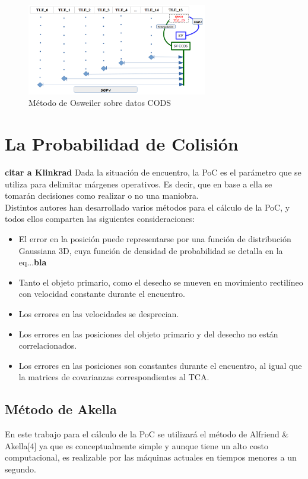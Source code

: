 \begin{figure}[!h]
 \centering
 \includegraphics[width=0.7\textwidth]{imagenes/Osweiler_sobre_Cods.png}
 \caption{M\'etodo de Osweiler sobre datos CODS}
\end{figure}

\section{La Probabilidad de Colisi\'on}
{\bf{citar a Klinkrad}}
Dada la situaci\'on de encuentro, la PoC es el par\'ametro que se utiliza para delimitar m\'argenes operativos.
Es decir, que en base a ella se tomar\'an decisiones como realizar o no una maniobra.\\
Distintos autores han desarrollado varios m\'etodos para el c\'alculo de la PoC, y todos ellos comparten las siguientes consideraciones:\\
\begin{itemize}
 \item El error en la posici\'on puede representarse por una funci\'on de distribuci\'on Gaussiana 3D, cuya funci\'on de densidad de probabilidad se detalla en la eq...{\bf{bla}} 
 \item Tanto el objeto primario, como el desecho se mueven en movimiento rectil\'ineo con velocidad constante durante el encuentro.
 \item Los errores en las velocidades se desprecian.
 \item Los errores en las posiciones del objeto primario y del desecho no est\'an correlacionados.
 \item Los errores en las posiciones son constantes durante el encuentro, al igual que la matrices de covarianzas correspondientes al TCA.
\end{itemize}

\subsection*{M\'etodo de Akella}
En este trabajo para el c\'alculo de la PoC se utilizar\'a el m\'etodo de Alfriend \& Akella[4] ya que es conceptualmente simple y aunque tiene un alto costo computacional, es realizable por las m\'aquinas actuales en tiempos menores a un segundo.\\

